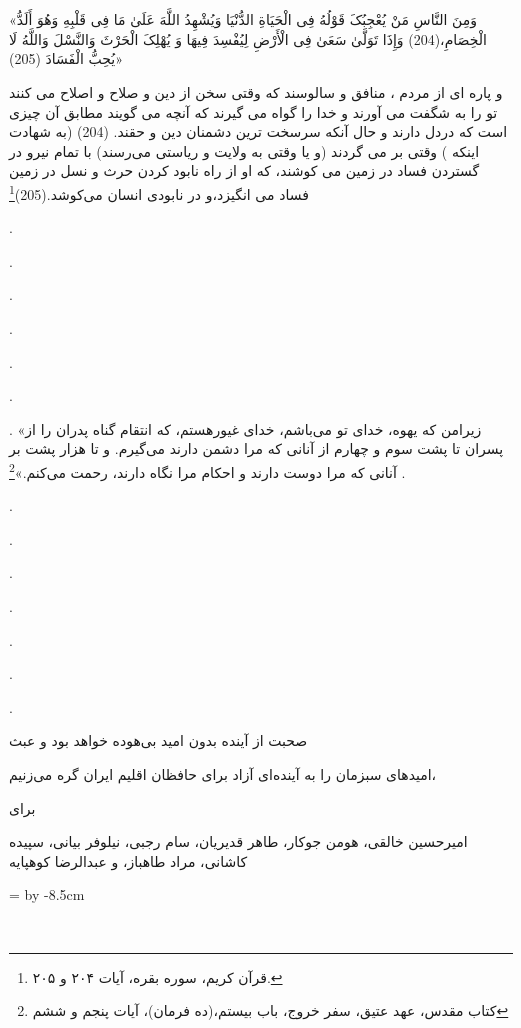 {\nastaliq
}\\
\vspace{.5cm}\\
{\scriptsize\nastaliq
{



«وَمِنَ النَّاسِ مَنْ یُعْجِبُکَ قَوْلُهُ فِی الْحَیَاةِ الدُّنْیَا وَیُشْهِدُ اللَّهَ عَلَىٰ مَا فِی قَلْبِهِ وَهُوَ أَلَدُّ الْخِصَامِ،(204) وَإِذَا تَوَلَّىٰ سَعَىٰ فِی الْأَرْضِ لِیُفْسِدَ فِیهَا وَ یُهْلِکَ الْحَرْثَ وَالنَّسْلَ  وَاللَّهُ لَا یُحِبُّ الْفَسَادَ (205)» 

و پاره اى از مردم ، منافق و سالوسند كه وقتى سخن از دين و صلاح و اصلاح مى كنند تو را به شگفت مى آورند و خدا را گواه مى گيرند كه آنچه مى گويند مطابق آن چيزى است كه دردل دارند و حال آنكه سرسخت ترين دشمنان دين و حقند. (204)
(به شهادت اينكه ) وقتى بر مى گردند (و يا وقتى به ولايت و رياستى مى‌رسند) با تمام نيرو در گستردن فساد در زمين مى كوشند، كه او از راه نابود كردن حرث و نسل در زمين فساد مى انگيزد،و در نابودى انسان مى‌كوشد.(205)\footnote{قرآن کریم، سوره بقره، آیات ۲۰۴ و ۲۰۵.}

.

.

.

.

.

.

.
«زیرامن که یهوه، خدای تو می‌باشم، خدای غیورهستم، که انتقام گناه پدران را از پسران تا پشت سوم و چهارم از آنانی که مرا دشمن دارند می‌گیرم. و تا هزار پشت بر آنانی که مرا دوست دارند و احکام مرا نگاه دارند، رحمت می‌کنم.»\footnote{کتاب مقدس، عهد عتیق، سفر خروج، باب بیستم،(ده فرمان)، آیات پنجم و ششم}
.

.

.

.

.

.

.

.

صحبت از آینده بدون امید بی‌هوده خواهد بود و عبث

امید‌های سبزمان را به آینده‌ای آزاد برای حافظان اقلیم ایران گره می‌زنیم، 

برای

امیرحسین خالقی، هومن جوکار، طاهر قدیریان، سام رجبی، نیلوفر بیانی، سپیده کاشانی، مراد طاهباز، و عبدالرضا کوهپایه
 }}
 
\vspace{.5cm}
{\nastaliq
\newdimen\xb
\xb=\textwidth
\advance \xb by -8.5cm
\hspace{\xb}

}
\newpage
\thispagestyle{empty}
\clearpage
~~~
\newpage
\thispagestyle{empty}
{\nastaliq
}
\\[2cm]


